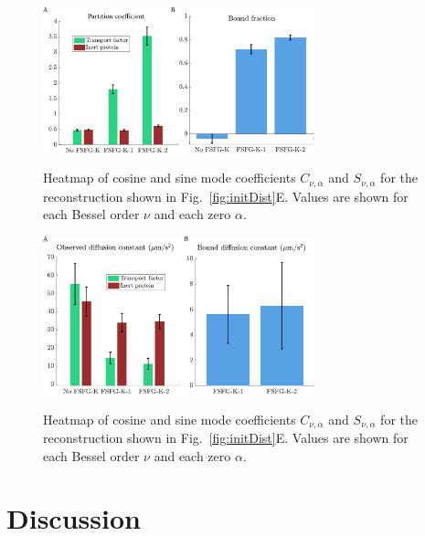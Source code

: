 \begin{figure}
\caption{Heatmap of cosine and sine mode coefficients $C_{\nu,\alpha}$ and $S_{\nu,\alpha}$ for the reconstruction shown in Fig.~\ref{fig:initDist}E. Values are shown for each Bessel order $\nu$ and each zero $\alpha$. \\}
\centering
\includegraphics[width=0.7\textwidth]{figs/ch04/fraction-bound}
\label{fig:frac-bound}
\end{figure} 

\begin{figure}
\caption{Heatmap of cosine and sine mode coefficients $C_{\nu,\alpha}$ and $S_{\nu,\alpha}$ for the reconstruction shown in Fig.~\ref{fig:initDist}E. Values are shown for each Bessel order $\nu$ and each zero $\alpha$. \\}
\centering
\includegraphics[width=0.7\textwidth]{figs/ch04/bound-diffusion}
\label{fig:bound-diffusion}
\end{figure} 

\section{Discussion}




